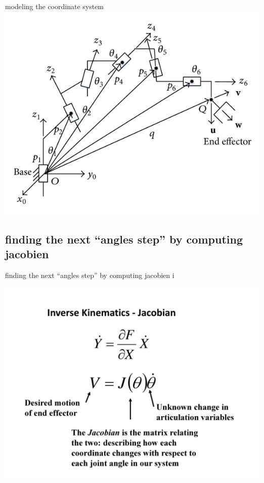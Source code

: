 \documentclass{beamer}
\begin{document}
\begin{frame}[allowframebreaks]{modeling the coordinate system}
\center
\includegraphics[scale = 1.8]{A-6R-manipulator-with-normal-configuration.png}\cite{4}

\end{frame}

\subsection{finding the next ``angles step'' by computing jacobien}
\begin{frame}{finding the next ``angles step'' by computing jacobien i}


\includegraphics[scale = 1.2]{slide_30.jpg}\cite{5}
\end{frame}
\end{document}
